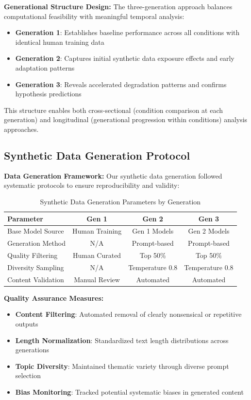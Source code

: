 \documentclass{article}
\begin{document}
\textbf{Generational Structure Design:}
The three-generation approach balances computational feasibility with meaningful temporal analysis:
\begin{itemize}
    \item \textbf{Generation 1}: Establishes baseline performance across all conditions with identical human training data
    \item \textbf{Generation 2}: Captures initial synthetic data exposure effects and early adaptation patterns
    \item \textbf{Generation 3}: Reveals accelerated degradation patterns and confirms hypothesis predictions
\end{itemize}

This structure enables both cross-sectional (condition comparison at each generation) and longitudinal (generational progression within conditions) analysis approaches.

\subsection{Synthetic Data Generation Protocol}

\textbf{Data Generation Framework:}
Our synthetic data generation followed systematic protocols to ensure reproducibility and validity:

\begin{table}[H]
\centering
\caption{Synthetic Data Generation Parameters by Generation}
\label{tab:data_generation_params}
\begin{tabular}{lccc}
\toprule
\textbf{Parameter} & \textbf{Gen 1} & \textbf{Gen 2} & \textbf{Gen 3} \\
\midrule
Base Model Source & Human Training & Gen 1 Models & Gen 2 Models \\
Generation Method & N/A & Prompt-based & Prompt-based \\
Quality Filtering & Human Curated & Top 50\% & Top 50\% \\
Diversity Sampling & N/A & Temperature 0.8 & Temperature 0.8 \\
Content Validation & Manual Review & Automated & Automated \\
\bottomrule
\end{tabular}
\end{table}

\textbf{Quality Assurance Measures:}
\begin{itemize}
    \item \textbf{Content Filtering}: Automated removal of clearly nonsensical or repetitive outputs
    \item \textbf{Length Normalization}: Standardized text length distributions across generations
    \item \textbf{Topic Diversity}: Maintained thematic variety through diverse prompt selection
    \item \textbf{Bias Monitoring}: Tracked potential systematic biases in generated content
\end{itemize}
\end{document}
